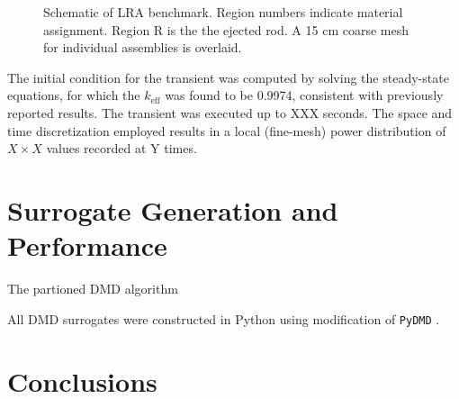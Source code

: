 \documentclass{anstrans}
\begin{document}
\begin{figure}
\caption{Schematic of LRA benchmark.  Region numbers indicate material assignment.  Region R is the the ejected rod.  A 15 cm coarse mesh for individual assemblies is overlaid.}
\label{fig:lra_core}
\end{figure}

The initial condition for the transient was computed by solving the steady-state equations, for which the $k_{\text{eff}}$ was found to be 0.9974, consistent with previously reported results.
The transient was executed up to XXX seconds.
The space and time discretization employed results in a local (fine-mesh) power distribution of $X \times X$ values recorded at Y times.


\section{Surrogate Generation and Performance}

The partioned DMD algorithm

All DMD surrogates were constructed in Python using modification of {\tt PyDMD} \cite{}.

\section{Conclusions}
\end{document}
